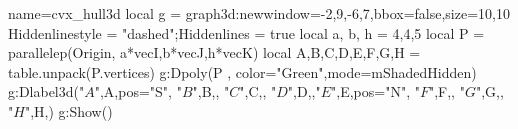 \documentclass[border=2 mm]{standalone}
\begin{document}
\begin{luadraw}{name=cvx_hull3d}
local g = graph3d:new{window={-2,9,-6,7},bbox=false,size={10,10}}
Hiddenlinestyle = "dashed";Hiddenlines = true
local a, b, h = 4,4,5
local P = parallelep(Origin, a*vecI,b*vecJ,h*vecK)
local A,B,C,D,E,F,G,H = table.unpack(P.vertices)
g:Dpoly(P , {color="Green",mode=mShadedHidden})
g:Dlabel3d("$A$",A,{pos="S"}, "$B$",B,{}, "$C$",C,{}, "$D$",D,{},"$E$",E,{pos="N"}, "$F$",F,{}, "$G$",G,{}, "$H$",H,{})
g:Show()
\end{luadraw}
\end{document}
